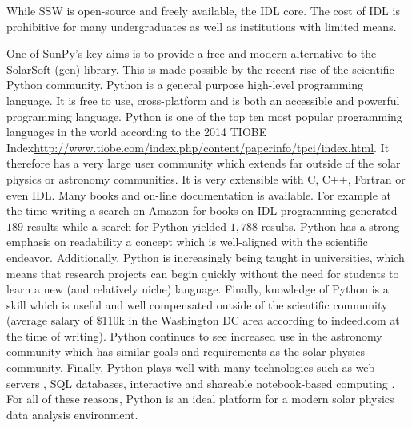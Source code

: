 
While SSW is open-source and freely available, the IDL core. The cost of IDL is prohibitive
for many undergraduates as well as institutions with limited means. 

One of SunPy's key aims is to provide a free and modern alternative 
to the SolarSoft (gen) library. This is made possible by the recent rise of the 
scientific Python community. Python is a general purpose high-level programming 
language. It is free to use, cross-platform and is both an accessible and powerful
programming language. Python is one of the top ten most popular programming languages 
in the world according to the 2014 TIOBE Index\url{http://www.tiobe.com/index.php/content/paperinfo/tpci/index.html}.
It therefore has a very large user community which extends far outside of the solar 
physics or astronomy communities. It is very extensible with C, C++, Fortran or 
even IDL. Many books and on-line documentation is 
available. For example at the time writing a search on Amazon for books 
on IDL programming generated $189$ results while a search for Python yielded 
$1,788$ results. Python has a strong emphasis on 
readability a concept which is well-aligned with the scientific endeavor.
Additionally, Python is increasingly being taught in universities,
which means that research projects can begin quickly 
without the need for students to learn a new (and relatively niche) 
language. Finally, knowledge of Python is a skill which is useful and well 
compensated outside of the scientific community (average salary of \$110k in 
the Washington DC area according to indeed.com at the time of writing).
Python continues to see increased use in the astronomy community 
\cite{2011ASPC..442..425G} which has similar goals and requirements as the solar physics
community. Finally, Python plays well with many technologies such as web servers \cite{2008JPhCS.119d2011D}, 
SQL databases, interactive and shareable notebook-based computing \cite{PER-GRA:2007}.
For all of these reasons, Python is an ideal platform for a modern solar physics 
data analysis environment.

